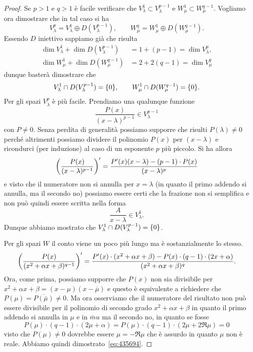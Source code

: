 \begin{proof}
Se $p>1$ e $q>1$
è facile verificare che $V_\lambda^1 \subset V_\lambda^{p-1}$
e $W_\mu^1 \subset W_\mu^{q-1}$. Vogliamo ora dimostrare che
in tal caso si ha
\begin{equation}\label{eq:435694}
V_\lambda^p = V_\lambda^1 \oplus D(V_\lambda^{p-1}),
\qquad
W_\mu^q = W_\mu^1 \oplus D(W_\mu^{q-1}).
\end{equation}
Essendo $D$ iniettivo sappiamo già che risulta
\begin{align*}
\dim V_\lambda^1 + \dim D(V_\lambda^{p-1}) &=
1+(p-1) = \dim V_\lambda^p, \\
\dim W_\mu^1 + \dim D(W_\mu^{q-1}) &=
2 + 2(q-1) = \dim V_\mu^q
\end{align*}
dunque basterà dimostrare che
\[
V_\lambda^1 \cap D(V_\lambda^{p-1}) = {\left\{ 0 \right\}},
\qquad
W_\mu^1 \cap D(W_\mu^{q-1}) = {\left\{ 0 \right\}}.
\]
Per gli spazi $V_\lambda^p$ è più facile.
Prendiamo una qualunque funzione
\[
\frac{P(x)}{(x-\lambda)^{p-1}}\in V_\lambda^{p-1}
\]
con $P\neq 0$.
Senza perdita di generalità possiamo supporre
che risulti $P(\lambda)\neq 0$ perché
altrimenti possiamo dividere il polinomio $P(x)$
per $(x-\lambda)$ e ricondurci (per induzione)
al caso di un esponente $p$ più piccolo.
Si ha allora
\[
  {\left( \frac{P(x)}{(x-\lambda)^{p-1}} \right)}'
  = \frac{P'(x) (x-\lambda) - (p-1) \cdot P(x)}{(x-\lambda)^p}
\]
e visto che il numeratore non si annulla per $x=\lambda$ (in quanto
il primo addendo si annulla, ma il secondo no) possiamo essere certi che la frazione non si semplifica e non può quindi
essere scritta nella forma
\[
  \frac{A}{x-\lambda} \in V_\lambda^1.
\]
Dunque abbiamo mostrato che $V_\lambda^1 \cap D(V_\lambda^{p-1}) = {\left\{ 0 \right\}}$.

Per gli spazi $W$ il conto viene un poco più lungo ma è sostanzialmente
lo stesso.
\[
  {\left( \frac{P(x)}{(x^2+\alpha x + \beta)^{q-1}} \right)}'
  = \frac{P'(x)\cdot (x^2+\alpha x + \beta)-P(x)\cdot (q-1)\cdot (2x+\alpha)}{(x^2+ \alpha x + \beta)^q}.
\]
Ora, come prima, possiamo supporre che $P(x)$ non sia divisibile per
$x^2 + \alpha x + \beta = (x-\mu)(x-\overline{\mu})$ e questo è equivalente
a richiedere che $P(\mu)=\overline{P(\bar \mu)}\neq 0$.
Ma ora osserviamo che il numeratore del risultato
non può essere divisibile per il polinomio di secondo grado
$x^2+\alpha x + \beta$
in quanto il primo addendo si annulla in $\mu$
e in $\bar mu$ ma il secondo no, in quanto se fosse
\[
P(\mu) \cdot (q-1) \cdot (2\mu + \alpha)
= P(\mu) \cdot (q-1) \cdot (2\mu + 2\Re \mu)
= 0
\]
visto che $P(\mu)\neq 0$ dovrebbe essere $\mu = - \Re \mu$
che è assurdo in quanto $\mu$ non è reale. Abbiamo quindi dimostrato~\eqref{eq:435694}.


\end{proof}

